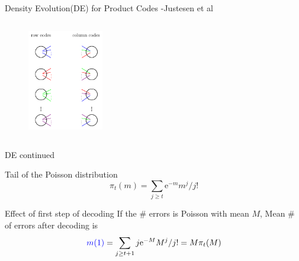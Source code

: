 \begin{frame}{Density Evolution(DE) for Product Codes -Justesen et al}
\begin{columns}
   	\begin{figure}[t]
   		\centering
   		\includegraphics[width=1.3in]{./Figures/Bipartite_graph}
   	\end{figure}
   		
   \end{columns}

\end{frame}
\begin{frame}{DE continued}
	\begin{block}{Tail of the Poisson distribution}
		\begin{equation}\nonumber
		\pi_t(m) = \sum_{j \geq t} \mathrm{e}^{-m}m^j/j!
		\label{eqn:defpi}
		\end{equation}
	\end{block}
	
	\begin{block}{Effect of first step of decoding}
		If the \# errors is Poisson with mean $M$, Mean \# of errors after decoding is
		\begin{equation}\nonumber
		\textcolor{blue}{m(1)} = \sum_{j \geq t+1} j\mathrm{e}^{-M}M^j/j! = M\pi_t(M)
		\label{eqn:defpi}
		\end{equation}
	\end{block}
	
\end{frame}
